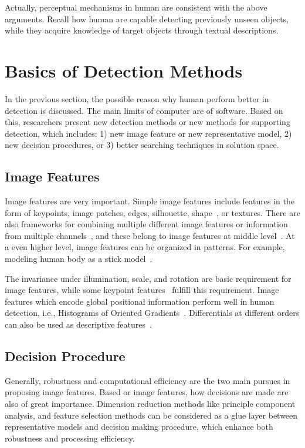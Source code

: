 Actually, perceptual mechanisms in human are consistent with the above arguments. Recall how human are capable detecting previously unseen objects, while they acquire knowledge of target objects through textual descriptions.

\section{Basics of Detection Methods}

In the previous section, the possible reason why human perform better in detection is discussed. The main limits of computer are of software. Based on this, researchers present new detection methods or new methods for supporting detection, which includes: 1) new image feature or new representative model, 2) new decision procedures, or 3) better searching techniques in solution space.
\subsection{Image Features}
Image features are very important. Simple image features include features in the form of keypoints, image patches, edges,  silhouette, shape~\cite{scontext}, or textures. There are also frameworks for combining multiple different image features or information from multiple channels~\cite{regionc,bgf,lbp,lss}, and these belong to image features at middle level~\cite{midf}. At a even higher level, image features can be  organized in patterns. For example, modeling human body as a stick model~\cite{stickb}.

The invariance under illumination, scale, and rotation are basic requirement for image features, while some keypoint features~\cite{ij2,o12,o14,o15,o2} fulfill this requirement. Image features which encode global positional information perform well in human detection, i.e., Histograms of Oriented
Gradients~\cite{ij4}. Differentials at different orders can also be used as descriptive features~\cite{ij6}.

 

\subsection{Decision Procedure}
Generally, robustness and computational efficiency are the two main pursues in proposing image features. Based or image features, how decisions are made are also of great importance. Dimension reduction methods like principle component analysis, and feature selection methods can be considered as a glue layer between representative models and decision making procedure, which enhance both robustness and processing efficiency.

